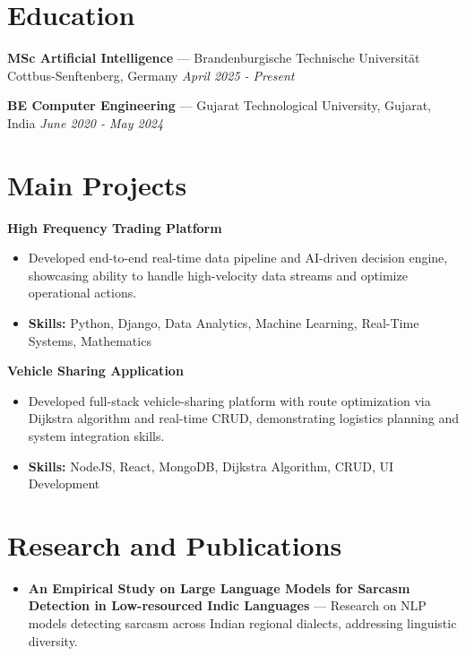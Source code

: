 \documentclass[a4paper,10pt]{article}
\begin{document}
\section*{Education}
\textbf{MSc Artificial Intelligence} — Brandenburgische Technische Universität Cottbus-Senftenberg, Germany \hfill \textit{April 2025 - Present}\par
\vspace{1.5pt}
\textbf{BE Computer Engineering} — Gujarat Technological University, Gujarat, India \hfill \textit{June 2020 - May 2024}\par

\section*{Main Projects}
\textbf{High Frequency Trading Platform}\par
\vspace{1pt}
\begin{itemize}
  \item Developed end-to-end real-time data pipeline and AI-driven decision engine, showcasing ability to handle high-velocity data streams and optimize operational actions.
  \item \textbf{Skills:} Python, Django, Data Analytics, Machine Learning, Real-Time Systems, Mathematics
\end{itemize}
\vspace{3pt}
\textbf{Vehicle Sharing Application}\par
\vspace{1pt}
\begin{itemize}
  \item Developed full-stack vehicle-sharing platform with route optimization via Dijkstra algorithm and real-time CRUD, demonstrating logistics planning and system integration skills.
  \item \textbf{Skills:} NodeJS, React, MongoDB, Dijkstra Algorithm, CRUD, UI Development
\end{itemize}

\section*{Research and Publications}
\begin{itemize}
\item \textbf{An Empirical Study on Large Language Models for Sarcasm Detection in Low-resourced Indic Languages} — Research on NLP models detecting sarcasm across Indian regional dialects, addressing linguistic diversity.
\end{itemize}
\end{document}
